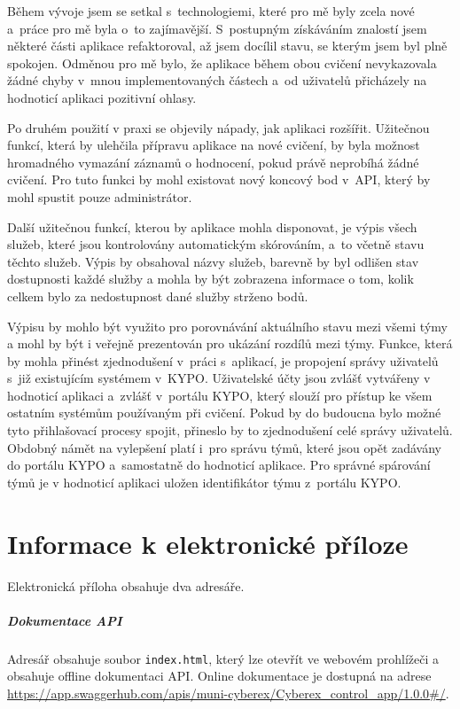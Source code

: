 \documentclass[
  digital,
  twoside,
  table, 
  nolof, 
  nolot
]{fithesis3}
\begin{document}
Během vývoje jsem se setkal s~technologiemi, které pro mě byly zcela nové a~práce pro mě byla o~to zajímavější. S~postupným získáváním znalostí jsem některé části aplikace refaktoroval, až jsem docílil stavu, se kterým jsem byl plně spokojen. Odměnou pro mě bylo, že aplikace během obou cvičení nevykazovala žádné chyby v~mnou implementovaných částech a~od uživatelů přicházely na hodnoticí aplikaci pozitivní ohlasy.

Po druhém použití v praxi se objevily nápady, jak aplikaci rozšířit. Užitečnou funkcí, která by ulehčila přípravu aplikace na nové cvičení, by byla možnost hromadného vymazání záznamů o hodnocení, pokud právě neprobíhá žádné cvičení. Pro tuto funkci by mohl existovat nový koncový bod v~API, který by mohl spustit pouze administrátor. 

Další užitečnou funkcí, kterou by aplikace mohla disponovat, je výpis všech služeb, které jsou kontrolovány automatickým skórováním, a~to včetně stavu těchto služeb. Výpis by obsahoval názvy služeb, barevně by byl odlišen stav dostupnosti každé služby a mohla by být zobrazena informace o tom, kolik celkem bylo za nedostupnost dané služby strženo bodů.

Výpisu by mohlo být využito pro porovnávání aktuálního stavu mezi všemi týmy a mohl by být i veřejně prezentován pro ukázání rozdílů mezi týmy. Funkce, která by mohla přinést zjednodušení v~práci s~aplikací, je propojení správy uživatelů s~již existujícím systémem v~KYPO. Uživatelské účty jsou zvlášť vytvářeny v hodnoticí aplikaci a~zvlášť v~portálu KYPO, který slouží pro přístup ke všem ostatním systémům používaným při cvičení. Pokud by do budoucna bylo možné tyto přihlašovací procesy spojit, přineslo by to zjednodušení celé správy uživatelů. Obdobný námět na vylepšení platí i~pro správu týmů, které jsou opět zadávány do portálu KYPO a~samostatně do hodnoticí aplikace. Pro správné spárování týmů je v hodnoticí aplikaci uložen identifikátor týmu z~portálu KYPO.

\printbibliography[heading=bibintoc] %

\appendix %
\chapter{Informace k elektronické příloze}

Elektronická příloha obsahuje dva adresáře.

\paragraph{Dokumentace API} Adresář obsahuje soubor \texttt{index.html}, který lze otevřít ve webovém prohlížeči a obsahuje offline dokumentaci API. Online dokumentace je dostupná na adrese \url{https://app.swaggerhub.com/apis/muni-cyberex/Cyberex_control_app/1.0.0#/}.
    
\end{document}
